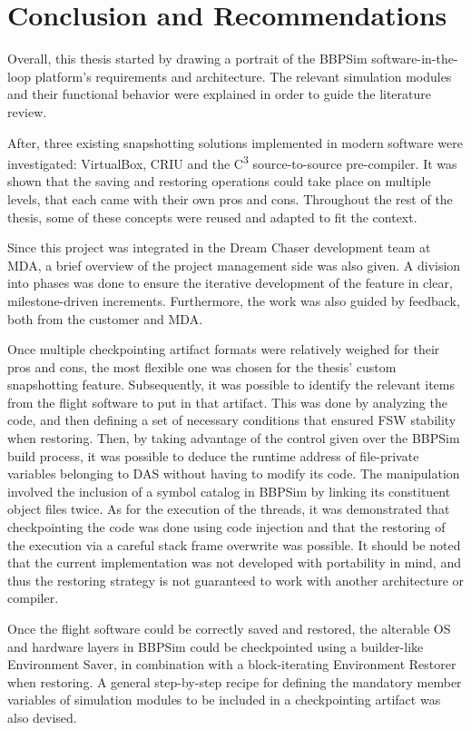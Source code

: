 \chapter{Conclusion and Recommendations}\label{cha:conclusion}
Overall, this thesis started by drawing a portrait of the \gls{BBPSim} software-in-the-loop platform's requirements and architecture. The relevant simulation modules and their functional behavior were explained in order to guide the literature review. 

After, three existing snapshotting solutions implemented in modern software were investigated: VirtualBox, \gls{CRIU} and the C\textsuperscript{3} source-to-source pre-compiler. It was shown that the saving and restoring operations could take place on multiple levels, that each came with their own pros and cons. Throughout the rest of the thesis, some of these concepts were reused and adapted to fit the context.

Since this project was integrated in the Dream Chaser development team at \gls{MDA}, a brief overview of the project management side was also given. A division into phases was done to ensure the iterative development of the feature in clear, milestone-driven increments. Furthermore, the work was also guided by feedback, both from the customer and MDA.

Once multiple checkpointing artifact formats were relatively weighed for their pros and cons, the most flexible one was chosen for the thesis' custom snapshotting feature. Subsequently, it was possible to identify the relevant items from the flight software to put in that artifact. This was done by analyzing the code, and then defining a set of necessary conditions that ensured FSW stability when restoring. Then, by taking advantage of the control given over the BBPSim build process, it was possible to deduce the runtime address of file-private variables belonging to DAS without having to modify its code. The manipulation involved the inclusion of a symbol catalog in BBPSim by linking its constituent object files twice. As for the execution of the threads, it was demonstrated that checkpointing the code was done using code injection and that the restoring of the execution via a careful stack frame overwrite was possible. It should be noted that the current implementation was not developed with portability in mind, and thus the restoring strategy is not guaranteed to work with another architecture or compiler.

Once the flight software could be correctly saved and restored, the alterable OS and hardware layers in BBPSim could be checkpointed using a builder-like Environment Saver, in combination with a block-iterating Environment Restorer when restoring. A general step-by-step recipe for defining the mandatory member variables of simulation modules to be included in a checkpointing artifact was also devised. 

